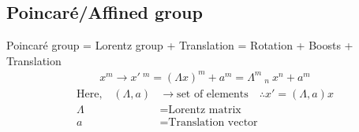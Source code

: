 \documentclass[14pt]{article} %
\begin{document}
\subsection{Poincaré/Affined group}
Poincaré group = Lorentz group + Translation 
= Rotation + Boosts + Translation 
\begin{align*}
x^m \rightarrow x'~^m = (\Lambda x)^m + a^m = \Lambda^{m}~_{n}~x^n + a^m
\end{align*}
\begin{align*}
    \text{Here,} \quad (\Lambda, a) &\rightarrow \text{set of elements} \quad  \therefore x' = (\Lambda, a)x \\
    \Lambda &= \text{Lorentz matrix} \\
    a &= \text{Translation vector}
\end{align*}
\end{document}
